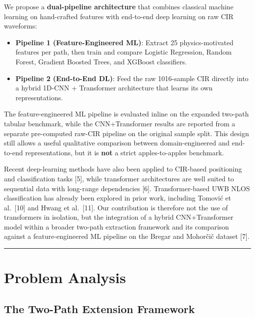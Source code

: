 \documentclass[12pt,a4paper]{article}
\providecommand{\tightlist}{%
  \setlength{\itemsep}{0pt}\setlength{\parskip}{0pt}}
\begin{document}
We propose a \textbf{dual-pipeline architecture} that combines classical
machine learning on hand-crafted features with end-to-end deep learning
on raw CIR waveforms:

\begin{itemize}
\tightlist
\item
  \textbf{Pipeline 1 (Feature-Engineered ML)}: Extract 25
  physics-motivated features per path, then train and compare Logistic
  Regression, Random Forest, Gradient Boosted Trees, and XGBoost
  classifiers.
\item
  \textbf{Pipeline 2 (End-to-End DL)}: Feed the raw 1016-sample CIR
  directly into a hybrid 1D-CNN + Transformer architecture that learns
  its own representations.
\end{itemize}

The feature-engineered ML pipeline is evaluated inline on the expanded
two-path tabular benchmark, while the CNN+Transformer results are
reported from a separate pre-computed raw-CIR pipeline on the original
sample split. This design still allows a useful qualitative comparison
between domain-engineered and end-to-end representations, but it is
\textbf{not} a strict apples-to-apples benchmark.

Recent deep-learning methods have also been applied to CIR-based
positioning and classification tasks {[}5{]}, while transformer
architectures are well suited to sequential data with long-range
dependencies {[}6{]}. Transformer-based UWB NLOS classification has
already been explored in prior work, including Tomović et al.~{[}10{]}
and Hwang et al.~{[}11{]}. Our contribution is therefore not the use of
transformers in isolation, but the integration of a hybrid
CNN+Transformer model within a broader two-path extraction framework and
its comparison against a feature-engineered ML pipeline on the Bregar
and Mohorčič dataset {[}7{]}.

\begin{center}\rule{0.5\linewidth}{0.5pt}\end{center}

\section{Problem Analysis}\label{problem-analysis}

\subsection{The Two-Path Extension
Framework}\label{the-two-path-extension-framework}
\end{document}
